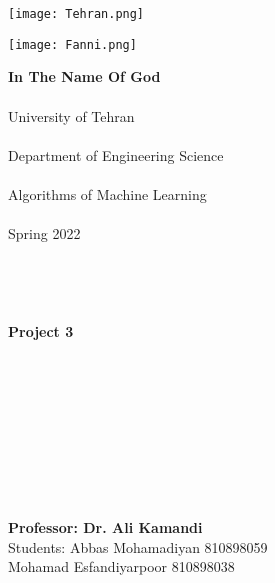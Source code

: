 \documentclass[a4paper,12pt]{article}
\begin{document}
\begin{landscape}
\vspace*{-2.3cm}
\hspace*{13cm}\texttt{[image: Tehran.png]}
\hspace*{-2cm}
\end{landscape}

\begin{landscape}
\vspace*{-4.3cm}
\hspace*{-3cm}\texttt{[image: Fanni.png]}
\hspace*{-2cm}
\end{landscape}

\begin{center}
	\textbf{In The Name Of God}
	\\\;
	\\{\LARGE University of Tehran}
	\\\;
	\\{\Large Department of Engineering Science}
	\\\;
	\\{\Large Algorithms of Machine Learning}
	\\\;
	\\{\Large Spring 2022}
	\\\;
	\\\;
	\\\;
	\\\;
	\\{\Huge \textbf{Project 3}}
	\\\;
	\\\;
	\\\;
	\\\;
	\\\;
	\\\;
	\\\;
	\\\;
	\\\;
	\\\textbf{Professor: Dr. Ali Kamandi}
	\\Students: Abbas Mohamadiyan 810898059
	\\Mohamad Esfandiyarpoor 810898038

\end{center}


\end{document}

